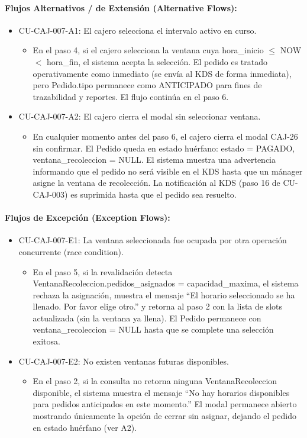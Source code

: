 \paragraph{Flujos Alternativos / de Extensión (Alternative Flows):}
\begin{itemize}
    \item CU-CAJ-007-A1: El cajero selecciona el intervalo activo en curso.
    \begin{itemize}
        \item En el paso 4, si el cajero selecciona la ventana cuya hora\_inicio $\le$ NOW $<$ hora\_fin, el sistema acepta la selección. El pedido es tratado operativamente como inmediato (se envía al KDS de forma inmediata), pero Pedido.tipo permanece como ANTICIPADO para fines de trazabilidad y reportes. El flujo continúa en el paso 6.
    \end{itemize}
    \item CU-CAJ-007-A2: El cajero cierra el modal sin seleccionar ventana.
    \begin{itemize}
        \item En cualquier momento antes del paso 6, el cajero cierra el modal CAJ-26 sin confirmar. El Pedido queda en estado huérfano: estado = PAGADO, ventana\_recoleccion = NULL. El sistema muestra una advertencia informando que el pedido no será visible en el KDS hasta que un mánager asigne la ventana de recolección. La notificación al KDS (paso 16 de CU-CAJ-003) es suprimida hasta que el pedido sea resuelto.
    \end{itemize}
\end{itemize}

\paragraph{Flujos de Excepción (Exception Flows):}
\begin{itemize}
    \item CU-CAJ-007-E1: La ventana seleccionada fue ocupada por otra operación concurrente (race condition).
    \begin{itemize}
        \item En el paso 5, si la revalidación detecta VentanaRecoleccion.pedidos\_asignados = capacidad\_maxima, el sistema rechaza la asignación, muestra el mensaje ``El horario seleccionado se ha llenado. Por favor elige otro.'' y retorna al paso 2 con la lista de slots actualizada (sin la ventana ya llena). El Pedido permanece con ventana\_recoleccion = NULL hasta que se complete una selección exitosa.
    \end{itemize}
    \item CU-CAJ-007-E2: No existen ventanas futuras disponibles.
    \begin{itemize}
        \item En el paso 2, si la consulta no retorna ninguna VentanaRecoleccion disponible, el sistema muestra el mensaje ``No hay horarios disponibles para pedidos anticipados en este momento.'' El modal permanece abierto mostrando únicamente la opción de cerrar sin asignar, dejando el pedido en estado huérfano (ver A2).
    \end{itemize}
\end{itemize}

